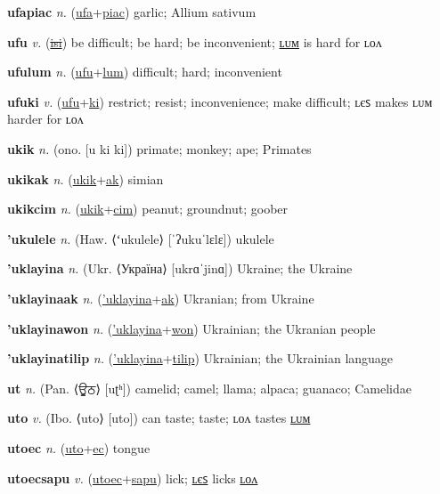 \textbf{\hypertarget{ufapiac}{ufapiac}} \textit{n.} (\hyperlink{ufa}{ufa}+\allowbreak \hyperlink{piac}{piac})
garlic; Allium sativum

\textbf{\hypertarget{ufu}{ufu}} \textit{v.} (\hyperlink{isi}{\sout{isi}})
be difficult; be hard; be inconvenient; \hyperlink{ufulum}{ʟᴜᴍ} is hard for ʟᴏᴧ

\textbf{\hypertarget{ufulum}{ufulum}} \textit{n.} (\hyperlink{ufu}{ufu}+\allowbreak \hyperlink{lum}{lum})
difficult; hard; inconvenient

\textbf{\hypertarget{ufuki}{ufuki}} \textit{v.} (\hyperlink{ufu}{ufu}+\allowbreak \hyperlink{ki}{ki})
restrict; resist; inconvenience; make difficult; ʟєꜱ makes ʟᴜᴍ harder for ʟᴏᴧ

\textbf{\hypertarget{ukik}{ukik}} \textit{n.} (ono. [u ki ki])
primate; monkey; ape; Primates

\textbf{\hypertarget{ukikak}{ukikak}} \textit{n.} (\hyperlink{ukik}{ukik}+\allowbreak \hyperlink{ak}{ak})
simian

\textbf{\hypertarget{ukikcim}{ukikcim}} \textit{n.} (\hyperlink{ukik}{ukik}+\allowbreak \hyperlink{cim}{cim})
peanut; groundnut; goober

\textbf{\hypertarget{'ukulele}{'ukulele}} \textit{n.} (Haw. ⟨ʻukulele⟩ [ˈʔukuˈlɛlɛ])
ukulele

\textbf{\hypertarget{'uklayina}{'uklayina}} \textit{n.} (Ukr. ⟨Україна⟩ [ukrɑˈjinɑ])
Ukraine; the Ukraine

\textbf{\hypertarget{'uklayinaak}{'uklayinaak}} \textit{n.} (\hyperlink{'uklayina}{'uklayina}+\allowbreak \hyperlink{ak}{ak})
Ukranian; from Ukraine

\textbf{\hypertarget{'uklayinawon}{'uklayinawon}} \textit{n.} (\hyperlink{'uklayina}{'uklayina}+\allowbreak \hyperlink{won}{won})
Ukrainian; the Ukranian people

\textbf{\hypertarget{'uklayinatilip}{'uklayinatilip}} \textit{n.} (\hyperlink{'uklayina}{'uklayina}+\allowbreak \hyperlink{tilip}{tilip})
Ukrainian; the Ukrainian language

\textbf{\hypertarget{ut}{ut}} \textit{n.} (Pan. ⟨{\gurmukhi{}ਊਠ}⟩ [uʈʰ])
camelid; camel; llama; alpaca; guanaco; Camelidae

\textbf{\hypertarget{uto}{uto}} \textit{v.} (Ibo. ⟨uto⟩ [uto])
can taste; taste; ʟᴏᴧ tastes \hyperlink{utolum}{ʟᴜᴍ}

\textbf{\hypertarget{utoec}{utoec}} \textit{n.} (\hyperlink{uto}{uto}+\allowbreak \hyperlink{ec}{ec})
tongue

\textbf{\hypertarget{utoecsapu}{utoecsapu}} \textit{v.} (\hyperlink{utoec}{utoec}+\allowbreak \hyperlink{sapu}{sapu})
lick; \hyperlink{utoecsapules}{ʟєꜱ} licks \hyperlink{utoecsapulon}{ʟᴏᴧ}

